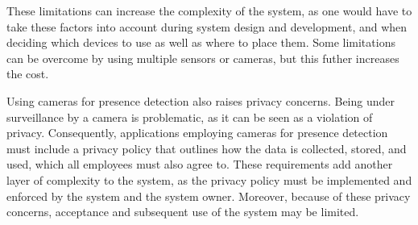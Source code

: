 These limitations can increase the complexity of the system, as one would have to take these factors into account during system design and development, and when deciding which devices to use as well as where to place them.
Some limitations can be overcome by using multiple sensors or cameras, but this futher increases the cost.\cite{FUERTES2022103473}

Using cameras for presence detection also raises privacy concerns.
Being under surveillance by a camera is problematic, as it can be seen as a violation of privacy.
Consequently, applications employing cameras for presence detection must include a privacy policy that outlines how the data is collected, stored, and used, which all employees must also agree to.
These requirements add another layer of complexity to the system, as the privacy policy must be implemented and enforced by the system and the system owner.
Moreover, because of these privacy concerns, acceptance and subsequent use of the system may be limited.\cite{granath_detecting_nodate, tang_occupancy_2020, PrivacyPreservingSensor}